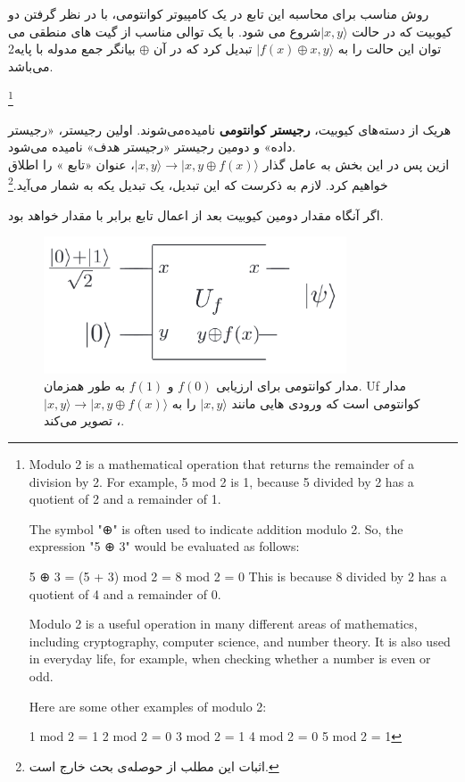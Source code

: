 \documentclass{book}
\begin{document}
روش مناسب برای محاسبه این تابع در یک کامپیوتر کوانتومی، با در نظر گرفتن دو کیوبیت که در حالت $\vert x, y\rangle$شروع می شود. با یک توالی مناسب از گیت های منطقی می توان این حالت را به $\vert f(x) \oplus x, y\rangle$ تبدیل کرد که در آن $\oplus$ بیانگر جمع مدوله با پایه‌2 می‌باشد.

\footnote{Modulo 2 is a mathematical operation that returns the remainder of a division by 2. For example, 5 mod 2 is 1, because 5 divided by 2 has a quotient of 2 and a remainder of 1.
	
	The symbol "⊕" is often used to indicate addition modulo 2. So, the expression "5 ⊕ 3" would be evaluated as follows:
	
	5 ⊕ 3 = (5 + 3) mod 2 = 8 mod 2 = 0
	This is because 8 divided by 2 has a quotient of 4 and a remainder of 0.
	
	Modulo 2 is a useful operation in many different areas of mathematics, including cryptography, computer science, and number theory. It is also used in everyday life, for example, when checking whether a number is even or odd.
	
	Here are some other examples of modulo 2:
	
	1 mod 2 = 1
	2 mod 2 = 0
	3 mod 2 = 1
	4 mod 2 = 0
	5 mod 2 = 1}

هریک از دسته‌های کیوبیت، \textbf{رجیستر کوانتومی} نامیده‌می‌شوند. اولین رجیستر، «رجیستر داده» و دومین رجیستر «رجیستر هدف» نامیده می‌شود.\\
ازین پس در این بخش به عامل گذار $\vert x, y \rangle \rightarrow \vert x, y \oplus f(x) \rangle$، عنوان «تابع » را اطلاق خواهیم کرد. لازم به ذکرست که این تبدیل، یک تبدیل یکه به شمار می‌آید.\footnote{اثبات این مطلب از حوصله‌ی بحث خارج است.}


اگر  آنگاه مقدار دومین کیوبیت بعد از اعمال تابع  برابر با مقدار  خواهد بود.

 \begin{center}
 	 \begin{figure}[ht]
 		\centering
 		\includegraphics[width=0.8\textwidth]{Uforacle.png}
 		\caption{مدار کوانتومی برای ارزیابی $f (0)$ و $f (1)$ به طور همزمان. Uf مدار کوانتومی است که ورودی هایی مانند $\vert x, y\rangle$ را به $\vert x, y \rangle \rightarrow \vert x, y \oplus f(x) \rangle$، تصویر می‌کند.}
 	\end{figure}
 \end{center}
\end{document}
